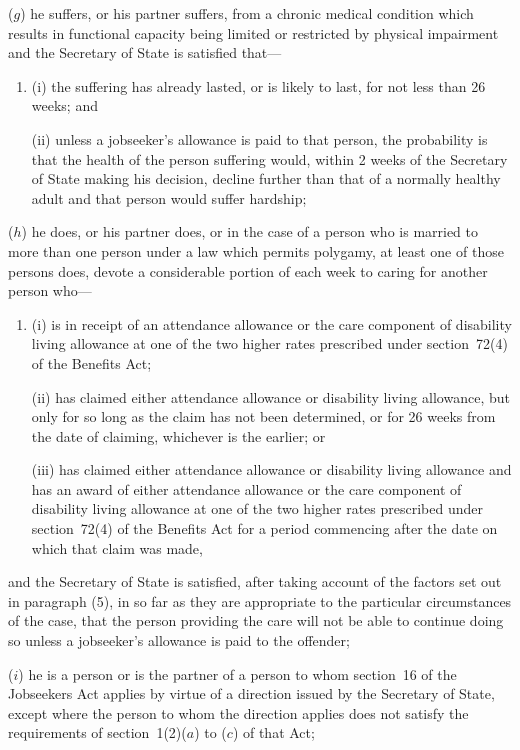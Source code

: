 \documentclass[12pt,a4paper]{article}
\begin{document}
\begin{enumerate}
($g$) he suffers, or his partner suffers, from a chronic medical condition which results in functional capacity being limited or restricted by physical impairment and the Secretary of State is satisfied that—
\begin{enumerate}\item[]
(i) the suffering has already lasted, or is likely to last, for not less than 26 weeks; and

(ii) unless a jobseeker’s allowance is paid to that person, the probability is that the health of the person suffering would, within 2 weeks of the Secretary of State making his decision, decline further than that of a normally healthy adult and that person would suffer hardship;
\end{enumerate}

($h$) he does, or his partner does, or in the case of a person who is married to more than one person under a law which permits polygamy, at least one of those persons does, devote a considerable portion of each week to caring for another person who—
\begin{enumerate}\item[]
(i) is in receipt of an attendance allowance or the care component of disability living allowance at one of the two higher rates prescribed under section~72(4) of the Benefits Act;

(ii) has claimed either attendance allowance or disability living allowance, but only for so long as the claim has not been determined, or for 26 weeks from the date of claiming, whichever is the earlier; or

(iii) has claimed either attendance allowance or disability living allowance and has an award of either attendance allowance or the care component of disability living allowance at one of the two higher rates prescribed under section~72(4) of the Benefits Act for a period commencing after the date on which that claim was made,
\end{enumerate}
and the Secretary of State is satisfied, after taking account of the factors set out in paragraph (5), in so far as they are appropriate to the particular circumstances of the case, that the person providing the care will not be able to continue doing so unless a jobseeker’s allowance is paid to the offender;

($i$) he is a person or is the partner of a person to whom section~16 of the Jobseekers Act applies by virtue of a direction issued by the Secretary of State, except where the person to whom the direction applies does not satisfy the requirements of section~1(2)($a$)  to ($c$)  of that Act;


\end{enumerate}
\end{document}

